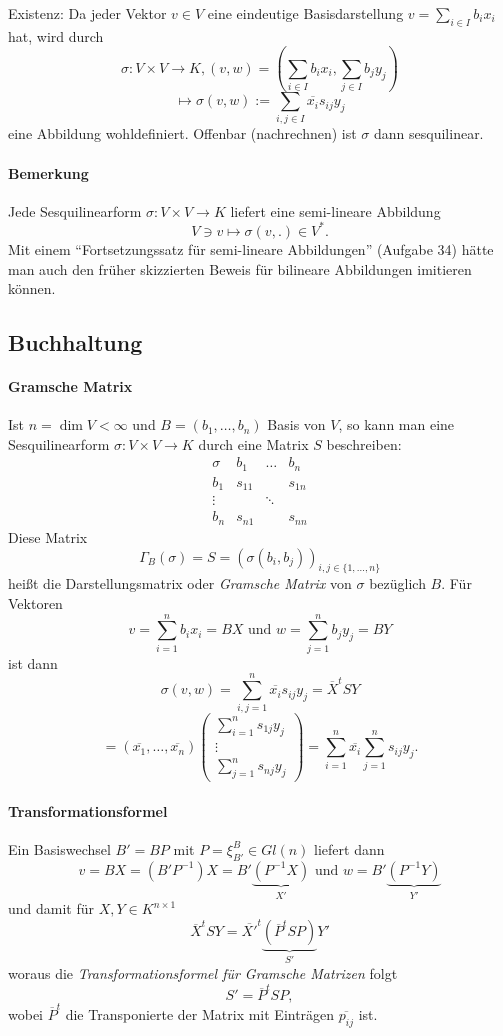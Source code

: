 	{Existenz:}
	Da jeder Vektor $ v\in V $ eine eindeutige Basisdarstellung $ v=\sum_{i\in I}b_ix_i $ hat, wird durch
	\[ \sigma:V\times V \to K, (v,w)= \left(\sum_{i\in I}b_ix_i, \sum_{j\in I}b_jy_j\right) \]
	\[ \mapsto \sigma(v,w) := \sum_{i,j\in I}\overline{x_i}s_{ij}y_j \]
	eine Abbildung wohldefiniert. Offenbar (nachrechnen) ist $ \sigma $ dann sesquilinear. 

\paragraph{Bemerkung}
	Jede Sesquilinearform $ \sigma: V\times V\to K $ liefert eine semi-lineare Abbildung
		\[ V\ni v\mapsto \sigma(v,.)\in V^*. \]
	Mit einem "`Fortsetzungssatz für semi-lineare Abbildungen"' (Aufgabe 34) hätte man auch den früher skizzierten Beweis für bilineare Abbildungen imitieren können.

\subsection{Buchhaltung}
\paragraph{Gramsche Matrix}
	Ist $ n=\dim V < \infty $ und $ B=(b_1,\dots,b_n) $ Basis von $ V $, so kann man eine Sesquilinearform $ \sigma: V\times V\to K $ durch eine Matrix $ S $ beschreiben:
	\[ \begin{array}{c|ccc}
	\sigma & b_1 & \dots & b_n \\ \hline
	b_1 & s_{11} &  & s_{1n} \\ 
	\vdots &  & \ddots &  \\ 
	b_n & s_{n1} &  & s_{nn}
	\end{array}  \]
	Diese Matrix
		\[ \Gamma_B(\sigma) = S = \left(\sigma(b_i,b_j)\right)_{i,j\in \{1,\dots,n\}} \]
	heißt die Darstellungsmatrix oder \emph{Gramsche Matrix} von $ \sigma $ bezüglich $ B $. Für Vektoren
		\[ v = \sum_{i=1}^{n}b_ix_i = BX \text{ und } w = \sum_{j=1}^{n}b_jy_j = BY \]
	ist dann
		\[ \sigma(v,w) = \sum_{i,j=1}^{n}\overline{x_i}s_{ij}y_j = \overline{X}^tSY \]
		\[ = (\overline{x_1},\dots,\overline{x_n})\begin{pmatrix}
		\sum_{i=1}^{n}s_{1j}y_j\\ \vdots\\ \sum_{j=1}^{n}s_{nj}y_j
		\end{pmatrix} = \sum_{i=1}^{n}\overline{x_i}\sum_{j=1}^{n}s_{ij}y_j. \]
\paragraph{Transformationsformel}
	Ein Basiswechsel $ B' = BP $ mit $ P = \xi_{B'}^B \in Gl(n)$ liefert dann
		\[ v = BX = (B'P^{-1})X = B'\underset{X'}{\underbrace{(P^{-1}X)}} \text{ und } w = B'\underset{Y'}{\underbrace{(P^{-1}Y)}} \]
	und damit für $ X,Y \in K^{n\times 1} $
		\[ \overline{X}^tSY = \overline{X'}^t\underset{S'}{\underbrace{(\overline{P}^tSP)}}Y' \]
	woraus die \emph{Transformationsformel für Gramsche Matrizen} folgt
		\[ S' = \overline{P}^tSP, \]
	wobei $ \overline{P}^t $ die Transponierte der Matrix mit Einträgen $ \overline{p_{ij}} $ ist.
